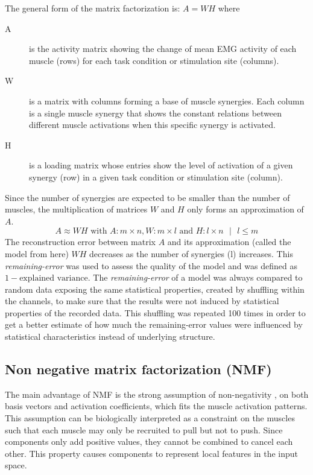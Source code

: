 The general form of the matrix factorization is: $A = W H$ where 

\begin{description}
	\item[A] is the activity matrix showing the change of mean EMG activity of each muscle (rows) for each task condition or stimulation site (columns). 
	\item[W] is a matrix with columns forming a base of muscle synergies. Each column is a single muscle synergy that shows the constant relations between different muscle activations when this specific synergy is activated.
	\item[H] is a loading matrix whose entries show the level of activation of a given synergy (row) in a given task condition or stimulation site (column). 	
\end{description}
  
Since the number of synergies are expected to be smaller than the number of muscles, the multiplication of matrices $W$ and $H$ only forms an approximation of $A$.
\begin{equation}
	A \approx W H \text{ with } A: m \times n, W: m \times l \text{ and } H: l \times n \text{  } | \text{  } l \leq m
\end{equation}
The reconstruction error between matrix $A$ and its approximation (called the model from here) $W H$ decreases as the number of synergies (l) increases. This \emph{remaining-error} was used to assess the quality of the model and was defined as $1 - \text{explained variance}$. The \emph{remaining-error} of a model was always compared to random data exposing the same statistical properties, created by shuffling within the channels, to make sure that the results were not induced by statistical properties of the recorded data. This shuffling was repeated 100 times in order to get a better estimate of how much the remaining-error values were influenced by statistical characteristics instead of underlying structure. 


\subsection{Non negative matrix factorization (NMF)} %
\label{sg:sub:nmf}

The main advantage of NMF is the strong assumption of non-negativity \citet{Lee:1999p1635}, on both basis vectors and activation coefficients, which fits the muscle activation patterns. This assumption can be biologically interpreted as a constraint on the muscles such that each muscle may only be recruited to pull but not to push. Since components only add positive values, they cannot be combined to cancel each other. This property causes components to represent local features in the input space.

